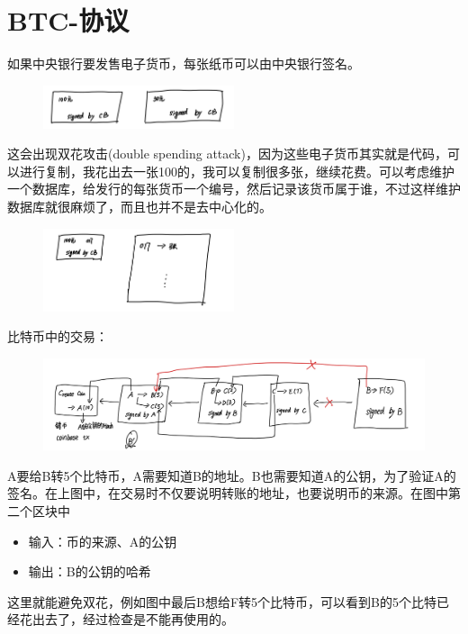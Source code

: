 \documentclass[10pt]{ctexart}
\begin{document}
\section{BTC-协议}
如果中央银行要发售电子货币，每张纸币可以由中央银行签名。
\begin{figure}[H]
    \centering
    \includegraphics[width=0.5\textwidth]{./lecture4/img1.png} 
\end{figure}
这会出现双花攻击(double spending attack)，因为这些电子货币其实就是代码，可以进行复制，我花出去一张100的，我可以复制很多张，继续花费。可以考虑维护一个数据库，给发行的每张货币一个编号，然后记录该货币属于谁，不过这样维护数据库就很麻烦了，而且也并不是去中心化的。
\begin{figure}[H]
    \centering
    \includegraphics[width=0.5\textwidth]{./lecture4/img2.png} 
\end{figure}
比特币中的交易：
\begin{figure}[H]
    \centering
    \includegraphics[width=1\textwidth]{./lecture4/img3.png} 
\end{figure}
A要给B转5个比特币，A需要知道B的地址。B也需要知道A的公钥，为了验证A的签名。在上图中，在交易时不仅要说明转账的地址，也要说明币的来源。在图中第二个区块中
\begin{itemize}
    \item 输入：币的来源、A的公钥
    \item 输出：B的公钥的哈希
\end{itemize}
这里就能避免双花，例如图中最后B想给F转5个比特币，可以看到B的5个比特已经花出去了，经过检查是不能再使用的。
\end{document}
